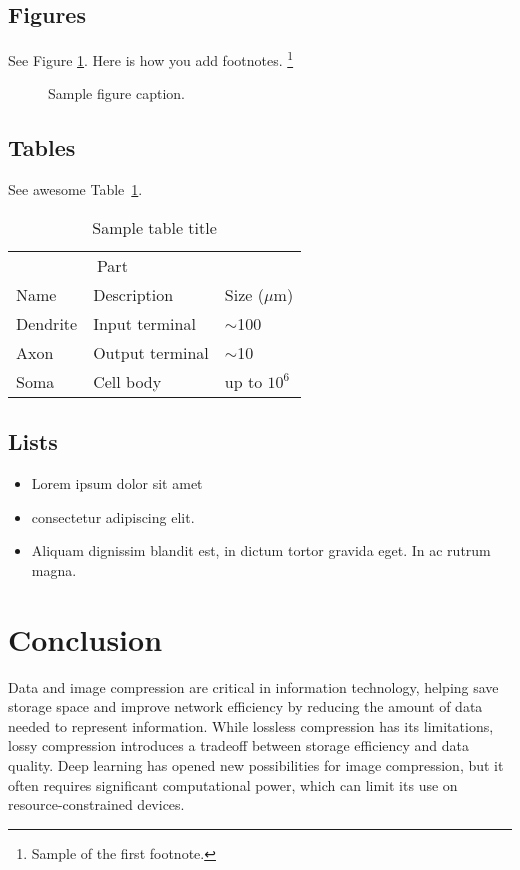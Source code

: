 \documentclass{article}
\begin{document}
\subsection{Figures}
\lipsum[10] 
See Figure \ref{fig:fig1}. Here is how you add footnotes. \footnote{Sample of the first footnote.}
\lipsum[11] 

\begin{figure}
  \centering
  \fbox{\rule[-.5cm]{4cm}{4cm} \rule[-.5cm]{4cm}{0cm}}
  \caption{Sample figure caption.}
  \label{fig:fig1}
\end{figure}

\subsection{Tables}
\lipsum[12]
See awesome Table~\ref{tab:table}.

\begin{table}
 \caption{Sample table title}
  \centering
  \begin{tabular}{lll}
    \toprule
    \multicolumn{2}{c}{Part}                   \\
    \cmidrule(r){1-2}
    Name     & Description     & Size ($\mu$m) \\
    \midrule
    Dendrite & Input terminal  & $\sim$100     \\
    Axon     & Output terminal & $\sim$10      \\
    Soma     & Cell body       & up to $10^6$  \\
    \bottomrule
  \end{tabular}
  \label{tab:table}
\end{table}

\subsection{Lists}
\begin{itemize}
\item Lorem ipsum dolor sit amet
\item consectetur adipiscing elit. 
\item Aliquam dignissim blandit est, in dictum tortor gravida eget. In ac rutrum magna.
\end{itemize}


\section{Conclusion}
Data and image compression are critical in information technology, helping save storage space and improve network efficiency by reducing the amount of data needed to represent information. While lossless compression has its limitations, lossy compression introduces a tradeoff between storage efficiency and data quality. Deep learning has opened new possibilities for image compression, but it often requires significant computational power, which can limit its use on resource-constrained devices.
\end{document}

